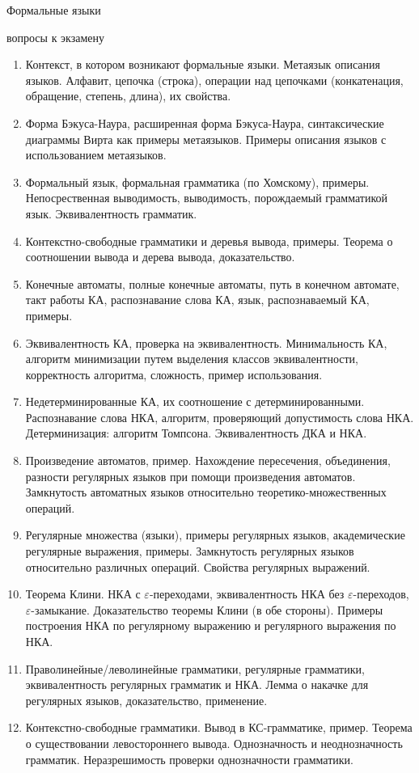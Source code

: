 \documentclass[12pt]{article}
\newcommand{\litem}[1]{\item #1 }%
\begin{document}
\begin{center}
{\LARGE Формальные языки}

{\Large вопросы к экзамену}
\end{center}

\medskip

\begin{enumerate}
  \litem {Контекст, в котором возникают формальные языки. Метаязык описания языков. Алфавит, цепочка (строка), операции над цепочками (конкатенация, обращение, степень, длина), их свойства.} 
  \litem {Форма Бэкуса-Наура, расширенная форма Бэкуса-Наура, синтаксические диаграммы Вирта как примеры метаязыков. Примеры описания языков с использованием метаязыков. }
  \litem {Формальный язык, формальная грамматика (по Хомскому), примеры. Непосрественная выводимость, выводимость, порождаемый грамматикой язык. Эквивалентность грамматик. }
  \litem {Контекстно-свободные грамматики и деревья вывода, примеры. Теорема о соотношении вывода и дерева вывода, доказательство.}
  \litem {Конечные автоматы, полные конечные автоматы, путь в конечном автомате, такт работы КА, распознавание слова КА, язык, распознаваемый КА, примеры. }
  \litem {Эквивалентность КА, проверка на эквивалентность. Минимальность КА, алгоритм минимизации путем выделения классов эквивалентности, корректность алгоритма, сложность, пример использования. }
  \litem {Недетерминированные КА, их соотношение с детерминированными. Распознавание слова НКА, алгоритм, проверяющий допустимость слова НКА. Детерминизация: алгоритм Томпсона. Эквивалентность ДКА и НКА.}
  \litem {Произведение автоматов, пример. Нахождение пересечения, объединения, разности регулярных языков при помощи произведения автоматов. Замкнутость автоматных языков относительно теоретико-множественных операций. }
  \litem {Регулярные множества (языки), примеры регулярных языков, академические регулярные выражения, примеры. Замкнутость регулярных языков относительно различных операций. Свойства регулярных выражений. }
  \litem {Теорема Клини. НКА с $\varepsilon$-переходами, эквивалентность НКА без $\varepsilon$-переходов, $\varepsilon$-замыкание. Доказательство теоремы Клини (в обе стороны). Примеры построения НКА по регулярному выражению и регулярного выражения по НКА.}
  \litem {Праволинейные/леволинейные грамматики, регулярные грамматики, эквивалентность регулярных грамматик и НКА. Лемма о накачке для регулярных языков, доказательство, применение. }
  \litem {Контекстно-свободные грамматики. Вывод в КС-грамматике, пример. Теорема о существовании левостороннего вывода. Однозначность и неоднозначность грамматик. Неразрешимость проверки однозначности грамматики. }

\end{enumerate}
\end{document}
